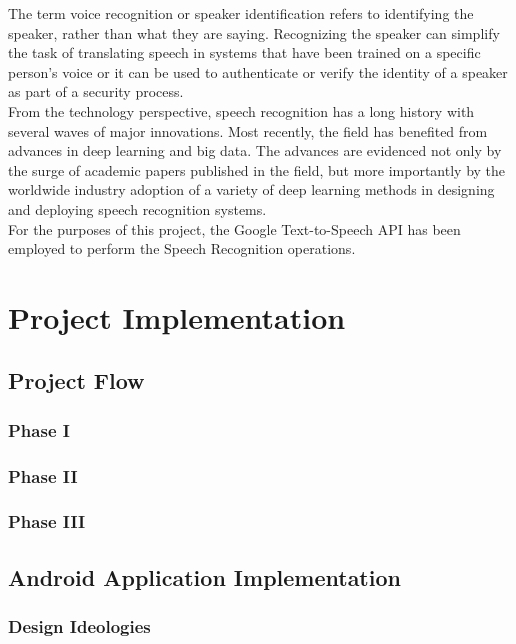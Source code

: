 \documentclass[14pt]{report}
\begin{document}
				The term voice recognition or speaker identification refers to identifying the speaker, rather than what they are saying. Recognizing the speaker can simplify the task of translating speech in systems that have been trained on a specific person's voice or it can be used to authenticate or verify the identity of a speaker as part of a security process.\\
				
				From the technology perspective, speech recognition has a long history with several waves of major innovations. Most recently, the field has benefited from advances in deep learning and big data. The advances are evidenced not only by the surge of academic papers published in the field, but more importantly by the worldwide industry adoption of a variety of deep learning methods in designing and deploying speech recognition systems.\\

				For the purposes of this project, the Google Text-to-Speech API has been employed to perform the Speech Recognition operations.
	\newpage


	\chapter{Project Implementation}\label{chapter4}
		
	

		\section{Project Flow}
			\subsection{Phase I}
			\subsection{Phase II}
			\subsection{Phase III}

		\section{Android Application Implementation}
			\subsection{Design Ideologies}
\end{document}
